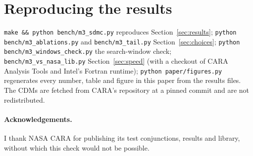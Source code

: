 \documentclass[11pt]{article}
\begin{document}
\section{Reproducing the results}

{\sloppy\noindent\texttt{make \&\& python bench/m3\_sdmc.py} reproduces Section~\ref{sec:results};
\texttt{python bench/m3\_ablations.py} and \texttt{bench/m3\_tail.py} Section~\ref{sec:choices};
\texttt{python bench/m3\_windows\_check.py} the search-window check;
\texttt{bench/m3\_vs\_nasa\_lib.py} Section~\ref{sec:speed} (with a checkout
of CARA Analysis Tools and Intel's Fortran runtime); \texttt{python paper/figures.py} regenerates
every number, table and figure in this paper from the results files. The CDMs are fetched from
CARA's repository at a pinned commit and are not redistributed.\par}

\paragraph{Acknowledgements.} I thank NASA CARA for publishing its test conjunctions, results
and library, without which this check would not be possible.



\end{document}
